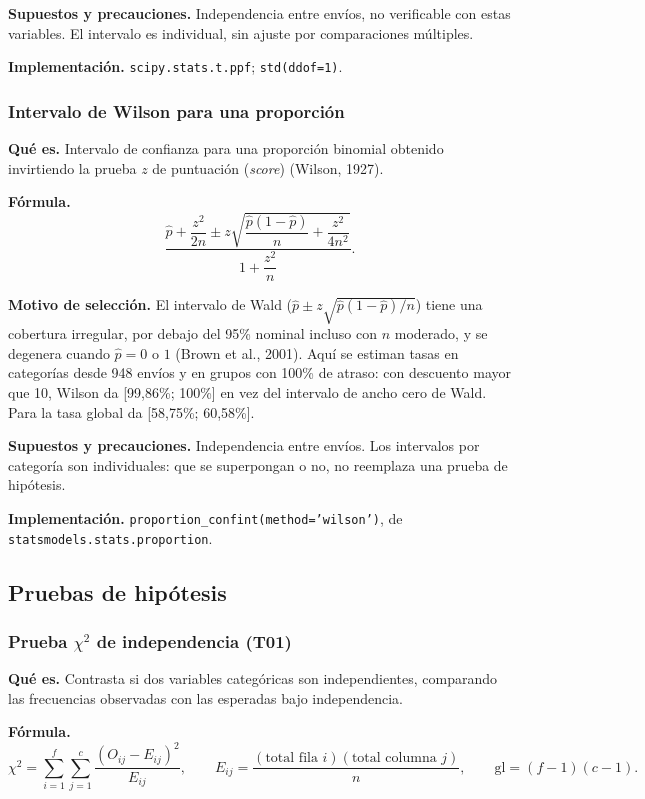 \documentclass[10pt,a4paper]{article}
\begin{document}
\textbf{Supuestos y precauciones.} Independencia entre envíos, no verificable con estas variables. El intervalo es individual, sin ajuste por comparaciones múltiples.

\textbf{Implementación.} \texttt{scipy.stats.t.ppf}; \texttt{std(ddof=1)}.

\subsubsection{Intervalo de Wilson para una proporción}
\textbf{Qué es.} Intervalo de confianza para una proporción binomial obtenido invirtiendo la prueba $z$ de puntuación (\emph{score}) (Wilson, 1927).

\textbf{Fórmula.}
\[
\frac{\hat p+\dfrac{z^2}{2n}\pm z\sqrt{\dfrac{\hat p(1-\hat p)}{n}+\dfrac{z^2}{4n^2}}}{1+\dfrac{z^2}{n}}.
\]

\textbf{Motivo de selección.} El intervalo de Wald ($\hat p\pm z\sqrt{\hat p(1-\hat p)/n}$) tiene una cobertura irregular, por debajo del 95\% nominal incluso con $n$ moderado, y se degenera cuando $\hat p=0$ o $1$ (Brown et al., 2001). Aquí se estiman tasas en categorías desde 948 envíos y en grupos con 100\% de atraso: con descuento mayor que 10, Wilson da [99,86\%; 100\%] en vez del intervalo de ancho cero de Wald. Para la tasa global da [58,75\%; 60,58\%].

\textbf{Supuestos y precauciones.} Independencia entre envíos. Los intervalos por categoría son individuales: que se superpongan o no, no reemplaza una prueba de hipótesis.

\textbf{Implementación.} \texttt{proportion\_confint(method='wilson')}, de \texttt{statsmodels.stats.proportion}.

\subsection{Pruebas de hipótesis}

\subsubsection{Prueba \texorpdfstring{$\chi^2$}{chi-cuadrado} de independencia (T01)}
\textbf{Qué es.} Contrasta si dos variables categóricas son independientes, comparando las frecuencias observadas con las esperadas bajo independencia.

\textbf{Fórmula.}
\[
\chi^2=\sum_{i=1}^{f}\sum_{j=1}^{c}\frac{(O_{ij}-E_{ij})^2}{E_{ij}},\qquad
E_{ij}=\frac{(\text{total fila } i)(\text{total columna } j)}{n},\qquad
\text{gl}=(f-1)(c-1).
\]
\end{document}
